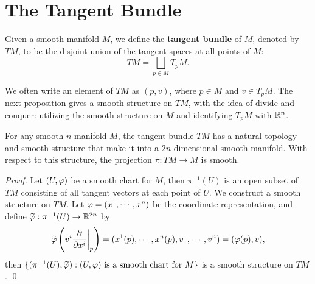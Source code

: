 \section{The Tangent Bundle}
\begin{definition}
Given a smooth manifold $M$, we define the \textbf{tangent bundle} of $M$, denoted by $TM$, to be the disjoint union of the tangent spaces at all points of $M$:
$$ TM = \bigsqcup_{p \in M}T_pM. $$
\end{definition}
We often write an element of $TM$ as $(p,v)$, where $p \in M$ and $v \in T_pM$. The next proposition gives a smooth structure on $TM$, with the idea of divide-and-conquer: utilizing the smooth structure on $M$ and identifying $T_pM$ with $\mathbb{R}^n$. 
\begin{proposition}
    For any smooth $n$-manifold $M$, the tangent bundle $TM$ has a natural topology and smooth structure that make it into a $2n$-dimensional smooth manifold. With respect to this structure, the projection $\pi: TM \to M$ is smooth.
\end{proposition}
\begin{proof}
    Let $(U,\varphi)$ be a smooth chart for $M$, then $\pi^{-1}(U)$ is an open subset of $TM$ consisting of all tangent vectors at each point of $U$. We construct a smooth structure on $TM$. Let $\varphi = (x^1, \cdots, x^n)$ be the coordinate representation, and define
    $\widetilde{\varphi}: \pi^{-1}(U) \to \mathbb{R}^{2n}$ by 
    $$ \widetilde{\varphi}\left(v^i \pdv{}{x^i}\bigg|_p\right) = 
    (x^1(p), \cdots, x^n(p), v^1, \cdots, v^n) = (\varphi(p), v), $$
    then $\{(\pi^{-1}(U), \widetilde{\varphi}): (U,\varphi) \text{ is a smooth chart for }M\}$ is a smooth structure on $TM$. \qed 
\end{proof}
